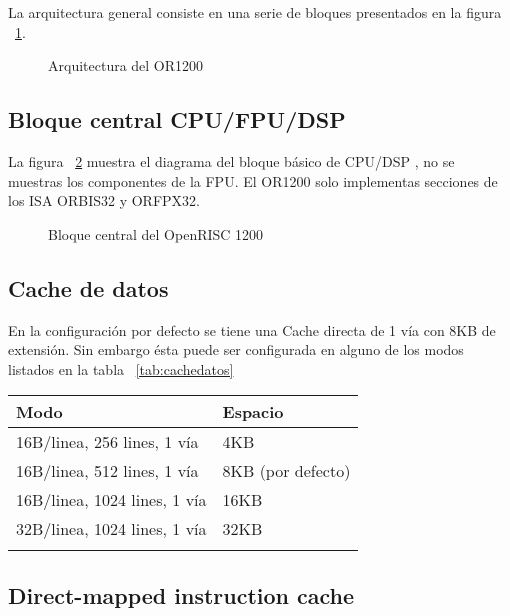 \documentclass[a4paper,11pt]{article}
\begin{document}
	La arquitectura general consiste en una serie de bloques presentados en la figura ~\ref{fig:ArqOR1200}.
		
	\begin{figure}[h!]
 	\begin{center}
  	\caption{Arquitectura del OR1200}
  	\label{fig:ArqOR1200}
 	\end{center}
	\end{figure}

	\subsection{Bloque central CPU/FPU/DSP}

	
	La figura ~\ref{fig:cpufpudsp} muestra el diagrama del bloque básico de CPU/DSP , no se muestras los componentes de la FPU. El OR1200 solo
	implementas secciones de los ISA ORBIS32 y ORFPX32. 

	
	\begin{figure}[!h]
 	\begin{center}
  	\caption{Bloque central del OpenRISC 1200}
  	\label{fig:cpufpudsp}
 	\end{center}
	\end{figure}
	
	\subsection{Cache de datos}
	En la configuración por defecto se tiene una Cache directa de 1 vía con 8KB de extensión. Sin embargo ésta puede ser configurada en alguno de los
	modos listados en la tabla ~\ref{tab:cachedatos} 
	
		\begin{tabular}{ p{10cm} p{5cm}}
		\rowcolor[gray]{0.8} Modo & Espacio\\
		\hline 
		16B/linea, 256 lines, 1 vía & 4KB\\
		\hline
		16B/linea, 512 lines, 1 vía & 8KB (por defecto)\\
		\hline
		16B/linea, 1024 lines, 1 vía & 16KB\\
		\hline 
		32B/linea, 1024 lines, 1 vía & 32KB\\
		\hline
		\label{tab:cachedatos}
		\end {tabular}
	\subsection{Direct-mapped instruction cache}
	
\end{document}
